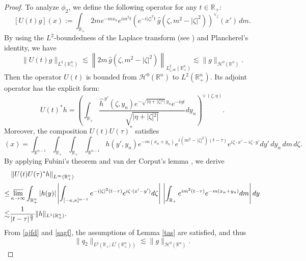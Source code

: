 \documentclass[preprint,compress,12pt]{elsarticle}
\numberwithin{equation}{section}
\begin{document}
\begin{proof}
	To analyze $\phi_{2}$, we define the following operator for any $t\in\mathbb{R}_{+}$:
	\begin{equation}\label{chagrin}
		[U(t)g](x):=\int_{\mathbb{R}_{+}}2m e^{-mx_{n}} e^{im^{2}t} \left(e^{-i|\zeta|^{2}t}\,\widehat{g}(\zeta,m^{2}-|\zeta|^{2})\right)^{\vee_{\zeta}}(x') \,dm.
	\end{equation}
	By using the $L^{2}$-boundedness of the Laplace transform (see \cite{kdv}) and Plancherel's identity, we have
	\begin{equation}\label{ajfd}
		\|U(t)g \|_{L^{2}(\mathbb{R}^{n}_{+})}\lesssim \left\|2m \,\widehat {g}(\zeta,m^{2}-|\zeta|^{2})\right\|_{L^{2}_{\zeta,m}(\mathbb{R}^{n}_{+})}\lesssim \|g\|_{\mathcal{H}^{0}(\mathbb{R}^{n})}.
	\end{equation}
	Then the operator $U(t)$ is bounded from $\mathcal{H}^{0}(\mathbb{R}^{n})$ to $L^{2}(\mathbb{R}^{n}_{+})$. Its adjoint operator has the explicit form:
	\begin{equation*}
		U(t)^{*}h=  \left(\int_{\mathbb{R}_{+}} \frac{\widehat{h}^{\,y'}(\zeta,y_{n})e^{-\sqrt{|\eta+|\zeta|^{2}|}\,y_{n}}e^{-i\eta t}}{\sqrt{|\eta+|\zeta|^{2}|}} dy_{n}\right)^{\vee\,(\zeta,\eta)}.
	\end{equation*}
	Moreover, the composition $U(t)U(\tau)^{*}$ satisfies
	{\small	\begin{equation*}
			[U(t)U(\tau)^{*}h](x)= \int_{\mathbb{R}^{n-1}}\int_{\mathbb{R}_{+}}\int_{\mathbb{R}_{+}}\int_{\mathbb{R}^{n-1}}h(y',y_{n}) e^{-m(x_{n}+y_{n})} e^{i(m^{2}-|\zeta|^{2})(t-\tau)} e^{i\zeta\cdot x'-i\zeta\cdot y'}dy'\,dy_{n}\,dm\,d\zeta.
	\end{equation*}}
	By applying Fubini's theorem and van der Corput's lemma \cite{mat}, we derive
	\begin{equation}\label{sagf}
		\begin{aligned}
			&\left\|U(t)U(\tau)^{*}h\right\|_{L^{\infty}(\mathbb{R}^{n}_{+})}\\		\leq&\varlimsup_{\kappa\rightarrow\infty}\int_{\mathbb{R}^{n}_{+}}|h(y)|\left|\int_{[-\kappa,\kappa]^{n-1}}e^{-i|\zeta|^{2}(t-\tau)} e^{i\zeta\cdot(x'-y')}d\zeta\right|\,\left|\int_{\mathbb{R}_{+}}e^{im^{2}(t-\tau)} e^{-m(x_{n}+y_{n})} dm\right| dy\\
			\lesssim&\frac{1}{|t-\tau|^{\frac{n}{2}}}\|h\|_{L^{1}(\mathbb{R}^{n}_{+})}.
		\end{aligned}
	\end{equation}
	From \eqref{ajfd} and \eqref{sagf}, the assumptions of Lemma \ref{tas} are satisfied, and thus
	\begin{equation}\label{sdf} \|q_{2}\|_{L^{q}(\mathbb{R}_{+};L^{r}(\mathbb{R}^{n}_{+}))}\lesssim \|g\|_{\mathcal{H}^{0}(\mathbb{R}^{n})}.
	\end{equation}
	

\end{proof}
\end{document}
